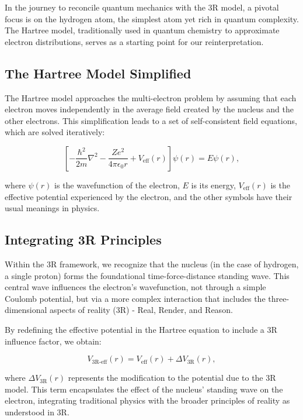 \documentclass[12pt]{article}
\begin{document}
In the journey to reconcile quantum mechanics with the 3R model, a pivotal focus is on the hydrogen atom, the simplest atom yet rich in quantum complexity. The Hartree model, traditionally used in quantum chemistry to approximate electron distributions, serves as a starting point for our reinterpretation.

\subsection{The Hartree Model Simplified}

The Hartree model approaches the multi-electron problem by assuming that each electron moves independently in the average field created by the nucleus and the other electrons. This simplification leads to a set of self-consistent field equations, which are solved iteratively:

\begin{equation}
    \left [ -\frac{\hbar^2}{2m}\nabla^2 - \frac{Ze^2}{4\pi\epsilon_0 r} + V_{\text{eff}}(r) \right ]\psi(r) = E\psi(r),
\end{equation}

where $\psi(r)$ is the wavefunction of the electron, $E$ is its energy, $V_{\text{eff}}(r)$ is the effective potential experienced by the electron, and the other symbols have their usual meanings in physics.

\subsection{Integrating 3R Principles}

Within the 3R framework, we recognize that the nucleus (in the case of hydrogen, a single proton) forms the foundational time-force-distance standing wave. This central wave influences the electron's wavefunction, not through a simple Coulomb potential, but via a more complex interaction that includes the three-dimensional aspects of reality (3R) - Real, Render, and Reason.

By redefining the effective potential in the Hartree equation to include a 3R influence factor, we obtain:

\begin{equation}
    V_{\text{3R-eff}}(r) = V_{\text{eff}}(r) + \Delta V_{\text{3R}}(r),
\end{equation}

where $\Delta V_{\text{3R}}(r)$ represents the modification to the potential due to the 3R model. This term encapsulates the effect of the nucleus' standing wave on the electron, integrating traditional physics with the broader principles of reality as understood in 3R.
\end{document}
